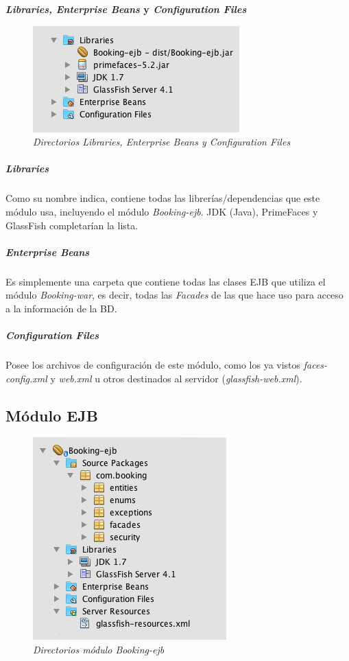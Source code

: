 \textbf{\textit{Libraries, Enterprise Beans} y \textit{Configuration Files}}
\\

\begin{figure}
\centering
  \includegraphics[scale=.70]{img/ficheros/otros-directorios-web.jpg}
  \caption{\textit{Directorios Libraries, Enterprise Beans y Configuration Files}}
  \label{fig:otros-directorios-web}
\end{figure}

\subparagraph{\textit{Libraries}}

Como su nombre indica, contiene todas las librerías/dependencias que este módulo usa, incluyendo el módulo \textit{Booking-ejb}. JDK (Java), PrimeFaces y GlassFish completarían la lista. \\

\subparagraph{\textit{Enterprise Beans}} 

Es simplemente una carpeta que contiene todas las clases EJB que utiliza el módulo \textit{Booking-war}, es decir, todas las \textit{Facades} de las que hace uso para acceso a la información de la BD. \\

\subparagraph{\textit{Configuration Files}} 

Posee los archivos de configuración de este módulo, como los ya vistos \textit{faces-config.xml} y \textit{web.xml} u otros destinados al servidor (\textit{glassfish-web.xml}).


\subsection{Módulo EJB}

\begin{figure}
\centering
  \includegraphics[scale=.70]{img/ficheros/ficheros-ejb.jpg}
  \caption{\textit{Directorios módulo Booking-ejb}}
  \label{fig:ficheros-ejb}
\end{figure}

